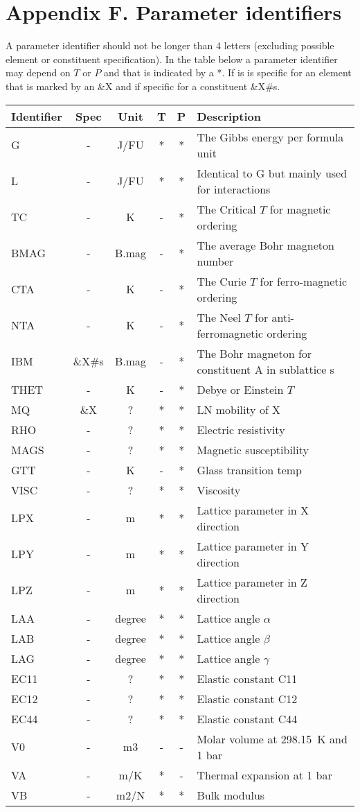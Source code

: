 \documentclass[12pt]{article}
\begin{document}
\newpage

\section{Appendix F.  Parameter identifiers}

A parameter identifier should not be longer than 4 letters (excluding
possible element or constituent specification).  In the table below a
parameter identifier may depend on $T$ or $P$ and that is indicated by
a *.  If is is specific for an element that is marked by an \&X and if
specific for a constituent \&X\#s.

\begin{tabular}{lccccl}
Identifier & Spec & Unit & T & P & Description\\\hline
G          & -    & J/FU & * & * &The Gibbs energy per formula unit\\
L          & -    & J/FU & * & * &Identical to G but mainly used for interactions\\ 
TC         & -    & K    & - & * & The Critical $T$ for magnetic ordering\\
BMAG       & -    & B.mag& - & * & The average Bohr magneton number\\
CTA        & -    & K    & - & * & The Curie $T$ for ferro-magnetic ordering\\
NTA        & -    & K    & - & * & The Neel $T$ for anti-ferromagnetic ordering\\
IBM        & \&X\#s &B.mag&- & * & The Bohr magneton for constituent A in sublattice s\\
THET       & - & K & - & * & Debye or Einstein $T$\\
MQ         & \&X  & ? & * & * & LN mobility of X \\
RHO        & - & ? & * & * & Electric resistivity\\
MAGS  & - & ? & * & * & Magnetic susceptibility\\
GTT   & - & K & - & * & Glass transition temp\\
VISC  & - & ? & * & * & Viscosity\\
LPX   & - & m & * & * & Lattice parameter in X direction\\
LPY   & - & m & * & * & Lattice parameter in Y direction\\
LPZ   & - & m & * & * & Lattice parameter in Z direction\\
LAA   & - &degree& * & * & Lattice angle $\alpha$\\
LAB   & - &degree& * & * & Lattice angle $\beta$\\
LAG   & - &degree& * & * & Lattice angle $\gamma$\\
EC11  & - & ? &* & * & Elastic constant C11\\
EC12  & - & ? &* & * & Elastic constant C12\\
EC44  & - & ? &* & * & Elastic constant C44\\
V0    & - & m3 &- & - & Molar volume at 298.15~K and 1 bar\\
VA    & - & m/K & * & - & Thermal expansion at 1 bar\\
VB    & - & m2/N & * & * &Bulk modulus\\\hline
\end{tabular}
\end{document}
